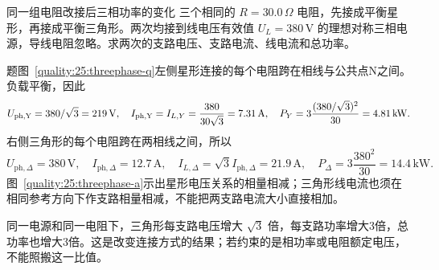 \begin{origexamplebox}{同一组电阻改接后三相功率的变化}\label{quality:25:ex:threephase}
三个相同的 $R=30.0\,\Omega$ 电阻，先接成平衡星形，再接成平衡三角形。两次均接到线电压有效值 $U_L=380\,\mathrm V$ 的理想对称三相电源，导线电阻忽略。求两次的支路电压、支路电流、线电流和总功率。
\begin{qualityfigure}\QualityThreePhaseLoads
{}\label{quality:25:threephase-q}
\end{qualityfigure}
\end{origexamplebox}
\begin{xesolution}
题图~\ref{quality:25:threephase-q}左侧星形连接的每个电阻跨在相线与公共点N之间。负载平衡，因此
\[
 U_{\rm ph,Y}=380/\sqrt3=219\,\mathrm V,\quad
 I_{\rm ph,Y}=I_{L,Y}=\frac{380}{30\sqrt3}=7.31\,\mathrm A,
 \quad P_Y=3\frac{(380/\sqrt3)^2}{30}=4.81\,\mathrm{kW}.
\]
右侧三角形的每个电阻跨在两相线之间，所以
\[
 U_{\mathrm{ph},\Delta}=380\,\mathrm V,\quad I_{\mathrm{ph},\Delta}=12.7\,\mathrm A,
 \quad I_{L,\Delta}=\sqrt3 I_{\mathrm{ph},\Delta}=21.9\,\mathrm A,
 \quad P_\Delta=3\frac{380^2}{30}=14.4\,\mathrm{kW}.
\]
图~\ref{quality:25:threephase-a}示出星形电压关系的相量相减；三角形线电流也须在相同参考方向下作支路相量相减，不能把两支路电流大小直接相加。
\begin{qualityfigure}
\label{quality:25:threephase-a}
\end{qualityfigure}
同一电源和同一电阻下，三角形每支路电压增大 $\sqrt3$ 倍，每支路功率增大3倍，总功率也增大3倍。这是改变连接方式的结果；若约束的是相功率或电阻额定电压，不能照搬这一比值。
\end{xesolution}

